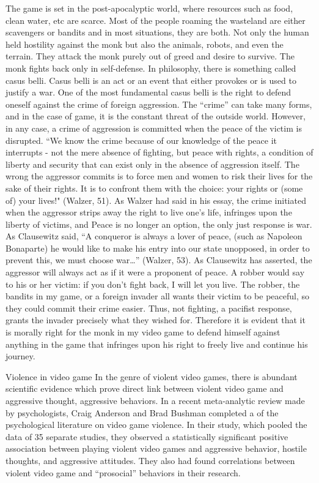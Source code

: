 \documentclass[10pt,twocolumn]{article}
\begin{document}
The game is set in the post-apocalyptic world, where resources such as food, clean water, etc are scarce. Most of the people roaming the wasteland are either scavengers or bandits and in most situations, they are both. Not only the human held hostility against the monk but also the animals, robots, and even the terrain. They attack the monk purely out of greed and desire to survive. The monk fights back only in self-defense. In philosophy, there is something called casus belli. Casus belli is an act or an event that either provokes or is used to justify a war. One of the most fundamental casus belli is the right to defend oneself against the crime of foreign aggression. The “crime” can take many forms, and in the case of game, it is the constant threat of the outside world. However, in any case, a crime of aggression is committed when the peace of the victim is disrupted. “We know the crime because of our knowledge of the peace it interrupts - not the mere absence of fighting, but peace with rights, a condition of liberty and security that can exist only in the absence of aggression itself. The wrong the aggressor commits is to force men and women to risk their lives for the sake of their rights. It is to confront them with the choice: your rights or (some of) your lives!" (Walzer, 51). As Walzer had said in his essay, the crime initiated when the aggressor strips away the right to live one's life, infringes upon the liberty of victims, and Peace is no longer an option, the only just response is war. As Clausewitz said, “A conqueror is always a lover of peace, (such as Napoleon Bonaparte) he would like to make his entry into our state unopposed, in order to prevent this, we must choose war…” (Walzer, 53). As Clausewitz has asserted, the aggressor will always act as if it were a proponent of peace. A robber would say to his or her victim: if you don't fight back, I will let you live. The robber, the bandits in my game, or a foreign invader all wants their victim to be peaceful, so they could commit their crime easier. Thus, not fighting, a pacifist response, grants the invader precisely what they wished for. Therefore it is evident that it is morally right for the monk in my video game to defend himself against anything in the game that infringes upon his right to freely live and continue his journey.

Violence in video game 
In the genre of violent video games, there is abundant scientific evidence which prove direct link between violent video game and aggressive thought, aggressive behaviors. 
In a recent meta-analytic review made by psychologists,  Craig Anderson and Brad Bushman completed a of the psychological literature on video game violence. In their study, which pooled the data of 35 separate studies, they observed a statistically significant positive association between playing violent video games and aggressive behavior, hostile thoughts, and aggressive attitudes. They also had found correlations between violent video game and “prosocial” behaviors in their research.   
\end{document}

